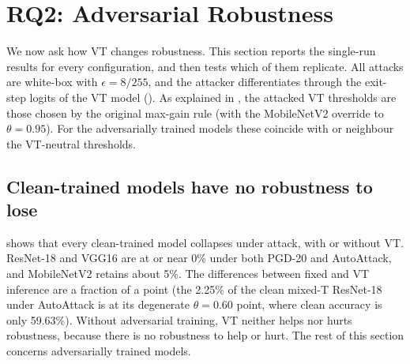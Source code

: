 \section{RQ2: Adversarial Robustness}
\label{sec:res-robustness}

We now ask how VT changes robustness. This section reports the single-run results for every configuration, and  then tests which of them replicate. All attacks are white-box with $\epsilon = 8/255$, and the attacker differentiates through the exit-step logits of the VT model (). As explained in , the attacked VT thresholds are those chosen by the original max-gain rule (with the MobileNetV2 override to $\theta = 0.95$). For the adversarially trained models these coincide with or neighbour the VT-neutral thresholds.

\subsection{Clean-trained models have no robustness to lose}

 shows that every clean-trained model collapses under attack, with or without VT. ResNet-18 and VGG16 are at or near 0\% under both PGD-20 and AutoAttack, and MobileNetV2 retains about 5\%. The differences between fixed and VT inference are a fraction of a point (the 2.25\% of the clean mixed-T ResNet-18 under AutoAttack is at its degenerate $\theta = 0.60$ point, where clean accuracy is only 59.63\%). Without adversarial training, VT neither helps nor hurts robustness, because there is no robustness to help or hurt. The rest of this section concerns adversarially trained models.

